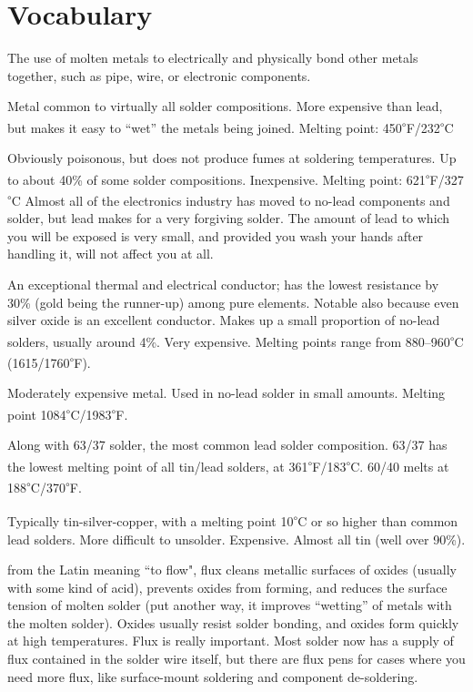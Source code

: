 \documentclass[12pt]{article}
\newcommand{\degs}[1]{\textsuperscript{$\circ$}#1}
\begin{document}
\newpage
\section{Vocabulary}

\begin{description}

\+[Soldering:] The use of molten metals to electrically and physically bond other metals together, such as pipe, wire, or electronic components.

\+[Tin:] Metal common to virtually all solder compositions. More expensive than lead, but makes it easy to ``wet'' the metals being joined. Melting point: 450\degs{F}/232\degs{C}

\+[Lead:] Obviously poisonous, but does not produce fumes at soldering temperatures. Up to about 40\% of some solder compositions. Inexpensive. Melting point: 621\degs{F}/327\degs{C} Almost all of the electronics industry has moved to no-lead components and solder, but lead makes for a very forgiving solder. The amount of lead to which you will be exposed is very small, and provided you wash your hands after handling it, will not affect you at all.

\+[Silver:] An exceptional thermal and electrical conductor; has the lowest resistance by 30\% (gold being the runner-up)  among pure elements. Notable also because even silver oxide is an excellent conductor. Makes up a small proportion of no-lead solders, usually around 4\%. Very expensive. Melting points range from 880--960\degs{C} (1615/1760\degs{F}). 

\+[Copper:] Moderately expensive metal. Used in no-lead solder in small amounts. Melting point 1084\degs{C}/1983\degs{F}. 

\+[60/40 solder:] Along with 63/37 solder, the most common lead solder composition. 63/37 has the lowest melting point of all tin/lead solders, at 361\degs{F}/183\degs{C}. 60/40 melts at 188\degs{C}/370\degs{F}. 

 Typically tin-silver-copper, with a melting point 10\degs{C} or so higher than common lead solders. More difficult to unsolder. Expensive. Almost all tin (well over 90\%).

\+[Flux:] from the Latin meaning ``to flow", flux cleans metallic surfaces of oxides (usually with some kind of acid), prevents oxides from forming, and reduces the surface tension of molten solder (put another way, it improves ``wetting'' of metals with the molten solder). Oxides usually resist solder bonding, and oxides form quickly at high temperatures. Flux is really important. Most solder now has a supply of flux contained in the solder wire itself, but there are flux pens for cases where you need more flux, like surface-mount soldering and component de-soldering.


\end{description}
\end{document}
